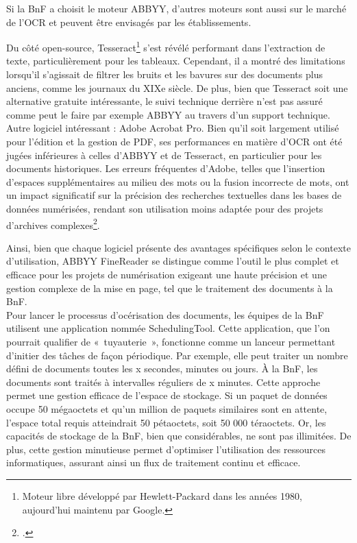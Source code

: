 \documentclass[a4paper,12pt,twoside]{book}
\begin{document}
	Si la BnF a choisit le moteur ABBYY, d’autres moteurs sont aussi sur le marché de l’OCR et peuvent être envisagés par les établissements. 
	
	Du côté open-source, Tesseract\footnote{ Moteur libre développé par Hewlett-Packard dans les années 1980, aujourd’hui maintenu par Google.} s’est révélé performant dans l’extraction de texte, particulièrement pour les tableaux. Cependant, il a montré des limitations lorsqu’il s’agissait de filtrer les bruits et les bavures sur des documents plus anciens, comme les journaux du XIXe siècle. De plus, bien que Tesseract soit une alternative gratuite intéressante, le suivi technique derrière n’est pas assuré comme peut le faire par exemple ABBYY au travers d’un support technique. Autre logiciel intéressant : Adobe Acrobat Pro. Bien qu’il soit largement utilisé pour l’édition et la gestion de PDF, ses performances en matière d’OCR ont été jugées inférieures à celles d’ABBYY et de Tesseract, en particulier pour les documents historiques. Les erreurs fréquentes d’Adobe, telles que l’insertion d’espaces supplémentaires au milieu des mots ou la fusion incorrecte de mots, ont un impact significatif sur la précision des recherches textuelles dans les bases de données numérisées, rendant son utilisation moins adaptée pour des projets d’archives complexes\footcite{olson_digitization_2021}.
	
	Ainsi, bien que chaque logiciel présente des avantages spécifiques selon le contexte d’utilisation, ABBYY FineReader se distingue comme l’outil le plus complet et efficace pour les projets de numérisation exigeant une haute précision et une gestion complexe de la mise en page, tel que le traitement des documents à la BnF.
	\\
	
	Pour lancer le processus d'océrisation des documents, les équipes de la BnF utilisent une application nommée SchedulingTool. Cette application, que l'on pourrait qualifier de « tuyauterie », fonctionne comme un lanceur permettant d'initier des tâches de façon périodique. Par exemple, elle peut traiter un nombre défini de documents toutes les x secondes, minutes ou jours. À la BnF, les documents sont traités à intervalles réguliers de x minutes. Cette approche permet une gestion efficace de l'espace de stockage. Si un paquet de données occupe 50 mégaoctets et qu'un million de paquets similaires sont en attente, l'espace total requis atteindrait 50 pétaoctets, soit 50 000 téraoctets. Or, les capacités de stockage de la BnF, bien que considérables, ne sont pas illimitées. De plus, cette gestion minutieuse permet d'optimiser l'utilisation des ressources informatiques, assurant ainsi un flux de traitement continu et efficace. 
	
\end{document}
